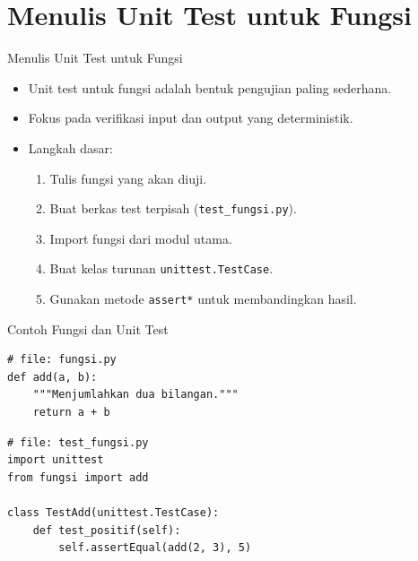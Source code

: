 \documentclass[aspectratio=169, table]{beamer}
\begin{document}
\section{Menulis Unit Test untuk Fungsi}

\begin{frame}[fragile]{Menulis Unit Test untuk Fungsi}
\vspace*{10pt}
\begin{itemize}
  \item Unit test untuk fungsi adalah bentuk pengujian paling sederhana.
  \item Fokus pada verifikasi input dan output yang deterministik.
  \item Langkah dasar:
  \begin{enumerate}
    \item Tulis fungsi yang akan diuji.
    \item Buat berkas test terpisah (\texttt{test\_fungsi.py}).
    \item Import fungsi dari modul utama.
    \item Buat kelas turunan \texttt{unittest.TestCase}.
    \item Gunakan metode \texttt{assert*} untuk membandingkan hasil.
  \end{enumerate}
\end{itemize}
\end{frame}

\begin{frame}[fragile]{Contoh Fungsi dan Unit Test}
\vspace*{10pt}
\begin{lstlisting}[style=PythonStyle, caption={Fungsi yang akan diuji}]
# file: fungsi.py
def add(a, b):
    """Menjumlahkan dua bilangan."""
    return a + b
\end{lstlisting}

\begin{lstlisting}[style=PythonStyle, caption={Pengujian fungsi add()}]
# file: test_fungsi.py
import unittest
from fungsi import add

class TestAdd(unittest.TestCase):
    def test_positif(self):
        self.assertEqual(add(2, 3), 5)
\end{lstlisting}
\end{frame}
\end{document}
